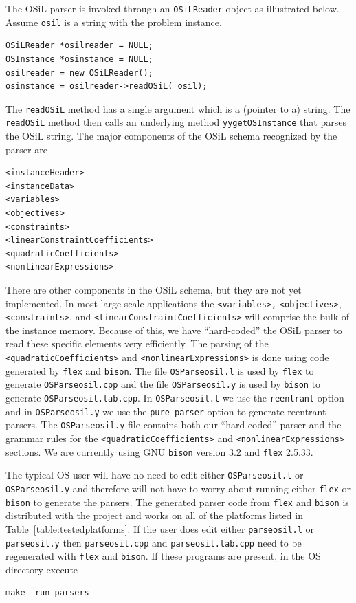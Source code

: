 \documentclass[11pt]{article}
\renewcommand{\_}{{\char"5F}}
\renewcommand{\{}{{\char"7B}}
\renewcommand{\}}{{\char"7D}}
\renewcommand{\^}{{\char"0D}}
\renewcommand{\'}{{\char"0D}}
\begin{document}
\begin{enumerate}[Step 1:]
The OSiL parser is invoked through an {\tt OSiLReader} object as illustrated below. Assume {\tt osil} is a string with the problem instance.
\begin{verbatim}
OSiLReader *osilreader = NULL;
OSInstance *osinstance = NULL;
osilreader = new OSiLReader();
osinstance = osilreader->readOSiL( osil);
\end{verbatim}
The {\tt  readOSiL} method  has a single argument which is a (pointer to a) string. 
The {\tt  readOSiL} method then calls an underlying method {\tt yygetOSInstance} that parses the OSiL string. 
The major components of the OSiL schema  recognized by the parser are
\begin{verbatim}
<instanceHeader>
<instanceData>
<variables>
<objectives>
<constraints>
<linearConstraintCoefficients>
<quadraticCoefficients>
<nonlinearExpressions>
\end{verbatim}
There are other components in the OSiL schema, but they are not yet implemented.
In most large-scale applications the {\tt <variables>,} {\tt <objectives>}, {\tt <constraints>}, and {\tt <linearConstraintCoefficients>}
will comprise the bulk of the instance memory.  Because of this, we have ``hard-coded'' the OSiL parser
to read these specific elements very efficiently.
The parsing of the {\tt <quadraticCoefficients>} and {\tt <nonlinearExpressions>} is done using code generated
by {\tt flex} and {\tt bison}. The file  
{\tt OSParseosil.l} is used by {\tt flex} to generate {\tt OSParseosil.cpp} and the file 
{\tt OSParseosil.y} is used by {\tt bison} to generate {\tt OSParseosil.tab.cpp}.
In {\tt OSParseosil.l} we use the {\tt reentrant} option and in {\tt OSParseosil.y} we use the
{\tt pure-parser} option to generate reentrant parsers. The {\tt OSParseosil.y} file  contains both our
``hard-coded'' parser and the grammar rules for the  {\tt <quadraticCoefficients>} and
{\tt <nonlinearExpressions>} sections.
We are currently using GNU {\tt bison} version 3.2 and {\tt flex} 2.5.33.

The typical OS user will have no need to edit either {\tt OSParseosil.l} or {\tt OSParseosil.y} 
and therefore will not have to worry about running either {\tt flex} or {\tt bison} to generate the parsers. 
The generated parser code from {\tt flex} and {\tt bison} is distributed with the project and works on all 
of the platforms listed in Table~\ref{table:testedplatforms}.  If the user does edit either {\tt parseosil.l} 
or {\tt parseosil.y} then {\tt parseosil.cpp} and {\tt parseosil.tab.cpp} need to be regenerated with 
{\tt flex} and {\tt bison}. If these programs are present, in the OS directory  execute
\begin{verbatim}
make  run_parsers
\end{verbatim}


\end{enumerate}
\end{document}
